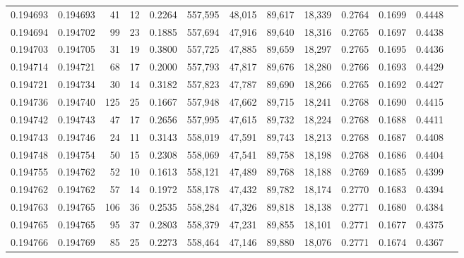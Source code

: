 \begin{tabular}{rrrrrrrrrrrrr}
0.194693 & 0.194693 &    41 &  12 &                                     0.2264 & 557,595 &  48,015 &  89,617 &  18,339 & 0.2764 & 0.1699 & 0.4448 \\
0.194694 & 0.194702 &    99 &  23 &                                     0.1885 & 557,694 &  47,916 &  89,640 &  18,316 & 0.2765 & 0.1697 & 0.4438 \\
0.194703 & 0.194705 &    31 &  19 &                                     0.3800 & 557,725 &  47,885 &  89,659 &  18,297 & 0.2765 & 0.1695 & 0.4436 \\
0.194714 & 0.194721 &    68 &  17 &                                     0.2000 & 557,793 &  47,817 &  89,676 &  18,280 & 0.2766 & 0.1693 & 0.4429 \\
0.194721 & 0.194734 &    30 &  14 &                                     0.3182 & 557,823 &  47,787 &  89,690 &  18,266 & 0.2765 & 0.1692 & 0.4427 \\
0.194736 & 0.194740 &   125 &  25 &                                     0.1667 & 557,948 &  47,662 &  89,715 &  18,241 & 0.2768 & 0.1690 & 0.4415 \\
0.194742 & 0.194743 &    47 &  17 &                                     0.2656 & 557,995 &  47,615 &  89,732 &  18,224 & 0.2768 & 0.1688 & 0.4411 \\
0.194743 & 0.194746 &    24 &  11 &                                     0.3143 & 558,019 &  47,591 &  89,743 &  18,213 & 0.2768 & 0.1687 & 0.4408 \\
0.194748 & 0.194754 &    50 &  15 &                                     0.2308 & 558,069 &  47,541 &  89,758 &  18,198 & 0.2768 & 0.1686 & 0.4404 \\
0.194755 & 0.194762 &    52 &  10 &                                     0.1613 & 558,121 &  47,489 &  89,768 &  18,188 & 0.2769 & 0.1685 & 0.4399 \\
0.194762 & 0.194762 &    57 &  14 &                                     0.1972 & 558,178 &  47,432 &  89,782 &  18,174 & 0.2770 & 0.1683 & 0.4394 \\
0.194763 & 0.194765 &   106 &  36 &                                     0.2535 & 558,284 &  47,326 &  89,818 &  18,138 & 0.2771 & 0.1680 & 0.4384 \\
0.194765 & 0.194765 &    95 &  37 &                                     0.2803 & 558,379 &  47,231 &  89,855 &  18,101 & 0.2771 & 0.1677 & 0.4375 \\
0.194766 & 0.194769 &    85 &  25 &                                     0.2273 & 558,464 &  47,146 &  89,880 &  18,076 & 0.2771 & 0.1674 & 0.4367 \\

\end{tabular}
